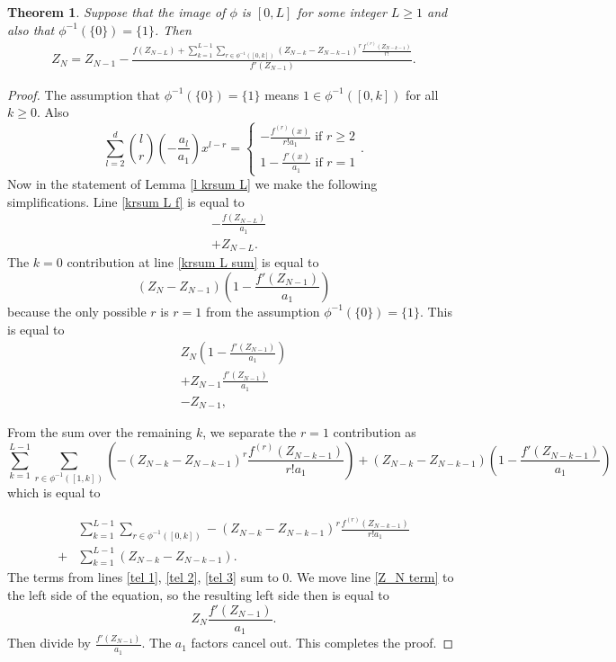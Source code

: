 \documentclass[11pt, oneside]{article}   	%
\newtheorem{theorem}{Theorem}
\begin{document}
\begin{theorem} \label{t main} 
Suppose that the image of $\phi$ is $[0,L]$ for some integer $L \geq 1$ and also that $\phi^{-1}(\{ 0\} )=\{ 1\}$. Then
\begin{align}
Z_N = Z_{N-1} - \frac{f(Z_{N-L})+ \sum_{k=1}^{L-1} \sum_{r \in \phi^{-1}([0,k])} (Z_{N-k} - Z_{N-k-1})^r \frac{f^{(r)}(Z_{N-k-1})}{r!}}{f'(Z_{N-1})}. \label{main}
\end{align}
\end{theorem}
\begin{proof}
 The assumption that $\phi^{-1}(\{ 0\}) = \{ 1\}$ means $1 \in \phi^{-1}([0,k])$ for all $ k \geq 0$. Also 
 \[
 \sum_{l=2}^d { l \choose r} (-\frac{a_l}{a_1})x^{l-r} = 
 \begin{cases} 
 -\frac{f^{(r)}(x)}{r!a_1} \text{ if } r \geq 2 \\ 
 1 -\frac{f'(x)}{a_1} \text{ if } r = 1
 \end{cases}.
 \]
Now in the statement of Lemma \ref{l krsum L} we make the following simplifications. Line \eqref{krsum L f} is equal to 
 \begin{align}
&-\frac{f(Z_{N-L})}{a_1}\\ 
&+ Z_{N-L} \label{tel 1}.
 \end{align}
The $k=0$ contribution at line \eqref{krsum L sum} is equal to 
\[
(Z_{N}-Z_{N-1})(1-\frac{f'(Z_{N-1})}{a_1})
\]
because the only possible $r$ is $r=1$ from the assumption $\phi^{-1}(\{ 0\}) = \{ 1\}$. 
This is equal to 
\begin{align}
Z_N(1-\frac{f'(Z_{N-1})}{a_1}) \label{Z_N term}\\ 
+Z_{N-1}\frac{f'(Z_{N-1})}{a_1} \\
 -Z_{N-1}, \label{tel 2}
\end{align}

From the sum over the remaining $k$, we separate the $r=1$ contribution as 
\[
\sum_{k=1}^{L-1}\sum_{r \in \phi^{-1}([1,k])} \left( -(Z_{N-k} - Z_{N-k-1})^r \frac{f^{(r)}(Z_{N-k-1})}{r!a_1} \right)+  (Z_{N-k} - Z_{N-k-1})(1-\frac{f'(Z_{N-k-1})}{a_1})
\] 
which is equal to 

\begin{align}
&\sum_{k=1}^{L-1}  \sum_{r \in \phi^{-1}([0,k])}-(Z_{N-k} - Z_{N-k-1})^r \frac{f^{(r)}(Z_{N-k-1})}{r!a_1} \\
+ &\sum_{k=1}^{L-1 }  (Z_{N-k} - Z_{N-k-1}). \label{tel 3}
\end{align}
The terms from lines \eqref{tel 1}, \eqref{tel 2}, \eqref{tel 3} sum to 0. 
We move line \eqref{Z_N term} to the left side of the equation, so the resulting left side then is equal to 
\[
Z_N \frac{f'(Z_{N-1})}{a_1}.
\]
Then divide by $\frac{f'(Z_{N-1})}{a_1}$. The $a_1$ factors cancel out. This completes the proof. 
\end{proof}
\end{document}
